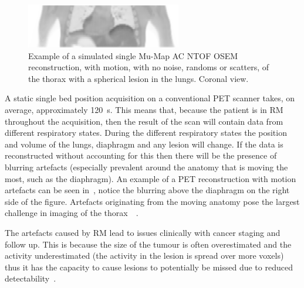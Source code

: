             \begin{figure}
                \centering
                
                \includegraphics[width=1.0\linewidth]{figures/background_single_mu-map_ac_example.png}
                
                \captionsetup{singlelinecheck=false, justification=raggedright}
                \caption{Example of a simulated single \gls{Mu-Map} \gls{AC} \gls{NTOF} \gls{OSEM} reconstruction, with motion, with no noise, randoms or scatters, of the thorax with a spherical lesion in the lungs. Coronal view.}
                \label{fig:respiratory_motion_artefacts_single_mu-map_ac}
            \end{figure}
            
            A static single bed position acquisition on a conventional \gls{PET} scanner takes, on average, approximately \SI{120}{\second}. This means that, because the patient is in \gls{RM} throughout the acquisition, then the result of the scan will contain data from different respiratory states. During the different respiratory states the position and volume of the lungs, diaphragm and any lesion will change. If the data is reconstructed without accounting for this then there will be the presence of blurring artefacts (especially prevalent around the anatomy that is moving the most, such as the diaphragm). %
            An example of a \gls{PET} reconstruction with motion artefacts can be seen in~, notice the blurring above the diaphragm on the right side of the figure. Artefacts originating from the moving anatomy pose the largest challenge in imaging of the thorax~~.
            
            The artefacts caused by \gls{RM} lead to issues clinically with cancer staging and follow up. This is because the size of the tumour is often overestimated and the activity underestimated (the activity in the lesion is spread over more voxels) thus it has the capacity to cause lesions to potentially be missed due to reduced detectability~. %
            
